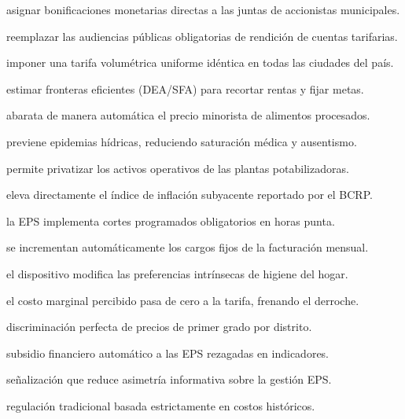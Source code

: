 \begin{opts}
    \item asignar bonificaciones monetarias directas a las juntas de accionistas municipales.
    \item reemplazar las audiencias públicas obligatorias de rendición de cuentas tarifarias.
    \item imponer una tarifa volumétrica uniforme idéntica en todas las ciudades del país.
    \item estimar fronteras eficientes (DEA/SFA) para recortar rentas y fijar metas.
\end{opts}

\begin{opts}
    \item abarata de manera automática el precio minorista de alimentos procesados.
    \item previene epidemias hídricas, reduciendo saturación médica y ausentismo.
    \item permite privatizar los activos operativos de las plantas potabilizadoras.
    \item eleva directamente el índice de inflación subyacente reportado por el BCRP.
\end{opts}

\begin{opts}
    \item la EPS implementa cortes programados obligatorios en horas punta.
    \item se incrementan automáticamente los cargos fijos de la facturación mensual.
    \item el dispositivo modifica las preferencias intrínsecas de higiene del hogar.
    \item el costo marginal percibido pasa de cero a la tarifa, frenando el derroche.
\end{opts}

\begin{opts}
    \item discriminación perfecta de precios de primer grado por distrito.
    \item subsidio financiero automático a las EPS rezagadas en indicadores.
    \item señalización que reduce asimetría informativa sobre la gestión EPS.
    \item regulación tradicional basada estrictamente en costos históricos.
\end{opts}

